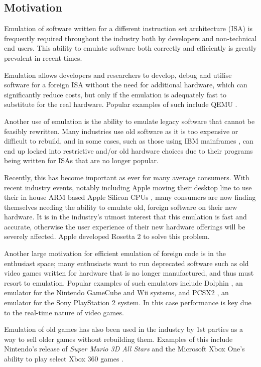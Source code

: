 \subsection{Motivation}

Emulation of software written for a different instruction set architecture (ISA) is frequently required throughout the industry both by developers and non-technical end users. This ability to emulate software both correctly and efficiently is greatly prevalent in recent times.

Emulation allows developers and researchers to develop, debug and utilise software for a foreign ISA without the need for additional hardware, which can significantly reduce costs, but only if the emulation is adequately fast to substitute for the real hardware. Popular examples of such include QEMU \cite{qemu}.

Another use of emulation is the ability to emulate legacy software that cannot be feasibly rewritten. Many industries use old software as it is too expensive or difficult to rebuild, and in some cases, such as those using IBM mainframes \cite{ibm-mainframe}, can end up locked into restrictive and/or old hardware choices due to their programs being written for ISAs that are no longer popular.

Recently, this has become important as ever for many average consumers. With recent industry events, notably including Apple moving their desktop line to use their in house ARM based Apple Silicon CPUs \cite{apple-silicon,rosetta2}, many consumers are now finding themselves needing the ability to emulate old, foreign software on their new hardware. It is in the industry's utmost interest that this emulation is fast and accurate, otherwise the user experience of their new hardware offerings will be severely affected. Apple developed Rosetta 2 \cite{rosetta2} to solve this problem.

Another large motivation for efficient emulation of foreign code is in the enthusiast space; many enthusiasts want to run deprecated software such as old video games written for hardware that is no longer manufactured, and thus must resort to emulation. Popular examples of such emulators include Dolphin \cite{dolphin}, an emulator for the Nintendo GameCube and Wii systems, and PCSX2 \cite{PCSX2}, an emulator for the Sony PlayStation 2 system. In this case performance is key due to the real-time nature of video games.

Emulation of old games has also been used in the industry by 1st parties as a way to sell older games without rebuilding them. Examples of this include Nintendo's release of \emph{Super Mario 3D All Stars} \cite{mario-emulation} and the Microsoft Xbox One's ability to play select Xbox 360 games \cite{xbox360-emulation}.
